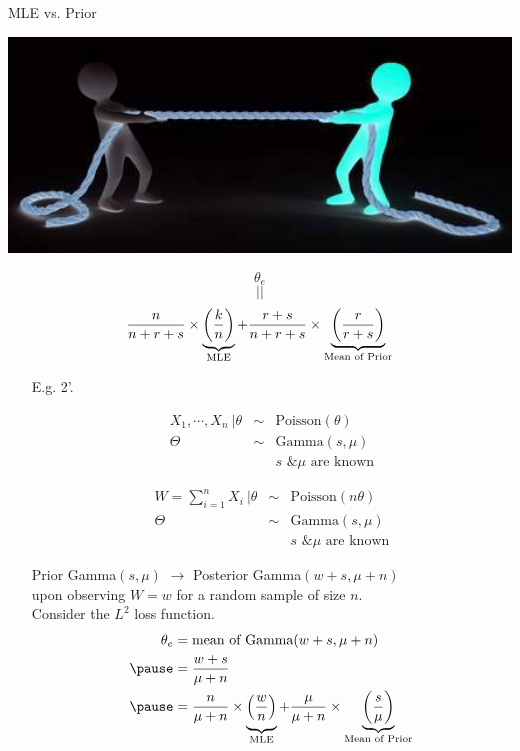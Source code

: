 \begin{frame}[fragile]
\begin{center}
  MLE vs. Prior

 \includegraphics[scale=0.25]{./Codes/tug_war.png}
\end{center}
\[\theta_e\]
\[||\]
\begin{align*}
 \frac{n}{n+r+s}\times \underbrace{\mystrut{1em}\left(\frac{k}{n}\right)}_{\text{MLE}} + \frac{r+s}{n+r+s} \times \underbrace{\left(\frac{r}{r+s}\right)}_{\text{Mean of Prior}}
 \end{align*}
\end{frame}
\begin{frame}
\begin{enumerate}
 \item[E.g. 2'.]
\begin{minipage}{0.45\textwidth}
\begin{eqnarray*}
 X_1,\cdots, X_n \:\big| \theta &\sim &\text{Poisson$(\theta)$}\\
 \Theta & \sim& \text{Gamma$(s,\mu)$}\\
 && \text{$s$ \& $\mu$ are known}
\end{eqnarray*}
\end{minipage}
\hfill
\begin{minipage}{0.45\textwidth}
\begin{eqnarray*}
 W=\sum_{i=1}^nX_i \: \bigg| \theta&\sim& \text{Poisson$(n\theta)$}\\
 \Theta & \sim& \text{Gamma$(s,\mu)$}\\
 && \text{$s$ \& $\mu$ are known}
\end{eqnarray*}
\end{minipage} \pause
\vfill
Prior Gamma$(s,\mu)$ $\rightarrow$ Posterior Gamma$(w+s,\mu+n)$ \\ \pause
 upon observing $W=w$ for a random sample of size $n$.  \\[1em] \pause
Consider the $L^2$ loss function.
 \begin{align*}
 \theta_e & =\text{mean of Gamma$(w+s,\mu+n)$} \\ \pause
 &= \frac{w+s}{\mu +n}\\ \pause
 &= \frac{n}{\mu+n}\times \underbrace{\mystrut{1em}\left(\frac{w}{n}\right)}_{\text{MLE}} + \frac{\mu}{\mu+n} \times \underbrace{\left(\frac{s}{\mu}\right)}_{\text{Mean of Prior}}
 \end{align*}
 \end{enumerate}
\end{frame}
